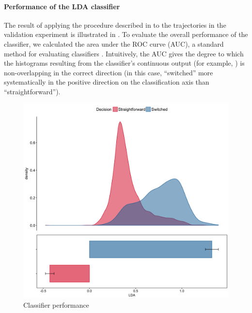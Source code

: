 \documentclass{article}
\begin{document}
\paragraph{Performance of the LDA classifier}
The result of applying the procedure described in  to the trajectories in the validation experiment is illustrated in . 
To evaluate the overall performance of the classifier, we calculated the area under the ROC curve (AUC), a standard method for evaluating classifiers \citep{Hastie}. Intuitively, the AUC gives the degree to which the histograms resulting from the classifier's continuous output (for example, ) is non-overlapping in the correct direction (in this case, ``switched'' more systematically in the positive direction on the classification axis than ``straightforward''). 


\begin{figure}
\centering
\includegraphics[width=\textwidth]{lda_distribution_calibration.png}
\caption{Classifier performance} \label{DIST:LDA}
\end{figure}
\end{document}
